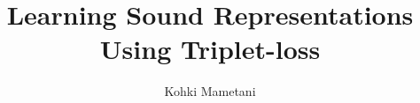 \documentclass[a4paper,12pt,twoside]{report}
\begin{document}

\title{Learning Sound Representations Using Triplet-loss}
\author{Kohki Mametani}

\maketitle

\maketitle
\restoregeometry

\preface
\cleardoublepage 




\body



% 
% 
% 

\listoffigures
\newpage
\listoftables




% 
\end{document}
